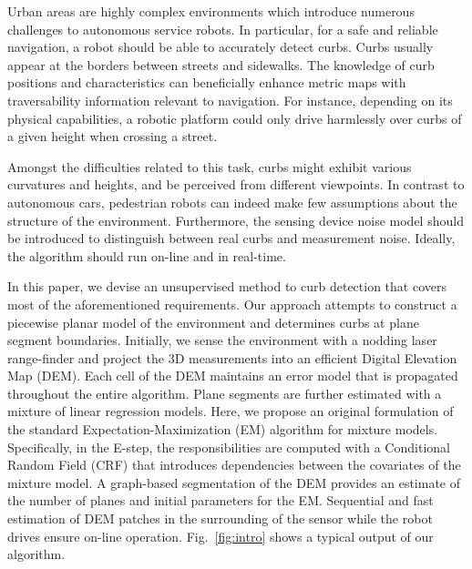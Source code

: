 Urban areas are highly complex environments which introduce numerous challenges
to autonomous service robots. In particular, for a safe and reliable navigation,
a robot should be able to accurately detect curbs. Curbs usually appear at the
borders between streets and sidewalks. The knowledge of curb positions and
characteristics can beneficially enhance metric maps with traversability
information relevant to navigation. For instance, depending on its physical
capabilities, a robotic platform could only drive harmlessly over curbs of a
given height when crossing a street.

Amongst the difficulties related to this task, curbs might exhibit various
curvatures and heights, and be perceived from different viewpoints. In contrast
to autonomous cars, pedestrian robots can indeed make few assumptions about
the structure of the environment. Furthermore, the sensing device noise model
should be introduced to distinguish between real curbs and measurement noise.
Ideally, the algorithm should run on-line and in real-time.

In this paper, we devise an unsupervised method to curb detection that covers
most of the aforementioned requirements. Our approach attempts to construct a
piecewise planar model of the environment and determines curbs at plane segment
boundaries. Initially, we sense the environment with a nodding laser
range-finder and project the 3D measurements into an efficient Digital Elevation
Map (DEM). Each cell of the DEM maintains an error model that is propagated
throughout the entire algorithm. Plane segments are further estimated with a
mixture of linear regression models. Here, we propose an original formulation of
the standard Expectation-Maximization (EM) algorithm for mixture models.
Specifically, in the E-step, the responsibilities are computed with a
Conditional Random Field (CRF) that introduces dependencies between the
covariates of the mixture model. A graph-based segmentation of the DEM provides
an estimate of the number of planes and initial parameters for the EM.
Sequential and fast estimation of DEM patches in the surrounding of the sensor
while the robot drives ensure on-line operation. Fig.~\ref{fig:intro} shows a
typical output of our algorithm.

